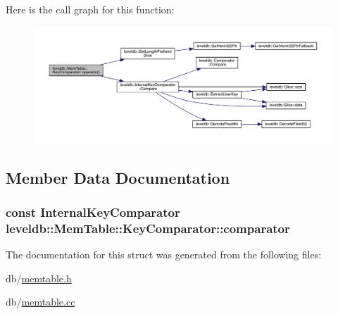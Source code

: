 Here is the call graph for this function\+:\nopagebreak
\begin{figure}[H]
\begin{center}
\leavevmode
\includegraphics[width=350pt]{structleveldb_1_1_mem_table_1_1_key_comparator_aa5bf375172b9c1877a4845fedb002f49_cgraph}
\end{center}
\end{figure}




\subsection{Member Data Documentation}
\hypertarget{structleveldb_1_1_mem_table_1_1_key_comparator_a2705898642635ed1af739042c569be52}{}
\subsubsection[{comparator}]{\setlength{\rightskip}{0pt plus 5cm}const {\bf Internal\+Key\+Comparator} leveldb\+::\+Mem\+Table\+::\+Key\+Comparator\+::comparator}\label{structleveldb_1_1_mem_table_1_1_key_comparator_a2705898642635ed1af739042c569be52}


The documentation for this struct was generated from the following files\+:\begin{DoxyCompactItemize}
\item 
db/\hyperlink{memtable_8h}{memtable.\+h}\item 
db/\hyperlink{memtable_8cc}{memtable.\+cc}\end{DoxyCompactItemize}
